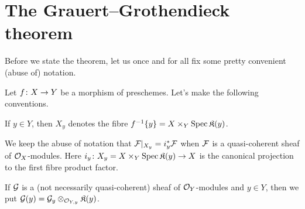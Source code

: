 \documentclass[a4paper,parskip=half,numbers=enddot, DIV=12]{scrreprt}
\begin{document}
\section{The Grauert--Grothendieck theorem}
Before we state the theorem, let us once and for all fix some pretty convenient (abuse of) notation.
\begin{con}
	Let $f\colon X\morphism Y$ be a morphism of preschemes. Let's make the following conventions.
	\begin{alphanumerate}
		\item If $y\in Y$, then $X_y$ denotes the fibre $f^{-1}\{y\}=X\times_Y\operatorname{Spec}\mathfrak{K}(y)$.
		\item We keep the abuse of notation that $\mathcal{F}|_{X_y}=i_y^*\mathcal{F}$ when $\mathcal{F}$ is a quasi-coherent sheaf of $\mathcal{O}_X$-modules. Here $i_y\colon X_y=X\times _Y\Spec \KK(y)\morphism X$ is the canonical projection to the first fibre product factor.
		\item If $\mathcal{G}$ is a (not necessarily quasi-coherent) sheaf of $\mathcal{O}_Y$-modules and $y\in Y$, then we put $\mathcal{G}(y)=\mathcal{G}_y\otimes_{\mathcal{O}_{Y,y}}\mathfrak{K}(y)$.
	\end{alphanumerate}
\end{con}
\end{document}

